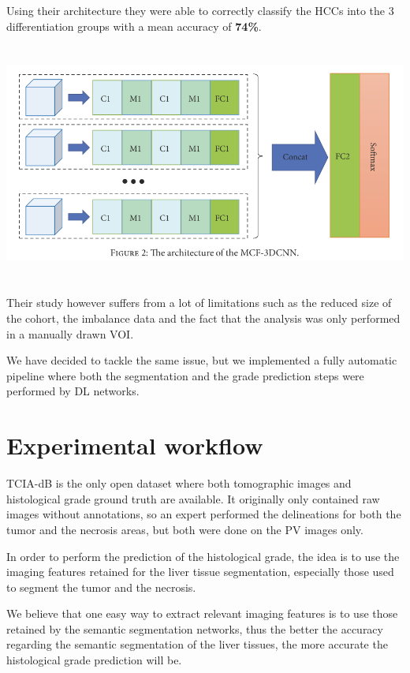 \documentclass[]{article}
\begin{document}
Using their architecture they were able to correctly classify the HCCs
into the 3 differentiation groups with a mean accuracy of \textbf{74\%}.

\includegraphics[width=6.26772in,height=3.11111in]{./images/media/image14.png}

Their study however suffers from a lot of limitations such as the
reduced size of the cohort, the imbalance data and the fact that the
analysis was only performed in a manually drawn VOI.

We have decided to tackle the same issue, but we implemented a fully
automatic pipeline where both the segmentation and the grade prediction
steps were performed by DL networks.

\section{Experimental workflow}\label{experimental-workflow}

TCIA-dB is the only open dataset where both tomographic images and
histological grade ground truth are available. It originally only
contained raw images without annotations, so an expert performed the
delineations for both the tumor and the necrosis areas, but both were
done on the PV images only.

In order to perform the prediction of the histological grade, the idea
is to use the imaging features retained for the liver tissue
segmentation, especially those used to segment the tumor and the
necrosis.

We believe that one easy way to extract relevant imaging features is to
use those retained by the semantic segmentation networks, thus the
better the accuracy regarding the semantic segmentation of the liver
tissues, the more accurate the histological grade prediction will be.
\end{document}
